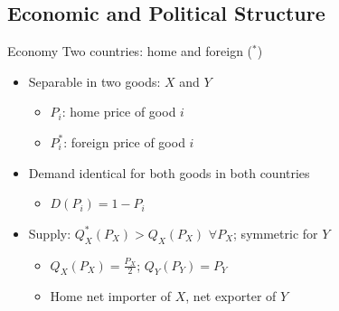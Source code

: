 \documentclass[handout]{beamer}
\begin{document}
\subsection{Economic and Political Structure}
\begin{frame}{Economy}
Two countries: home and foreign (${}^*$)
\pause
\begin{itemize}[<+->]
	\item Separable in two goods: $X$ and $Y$
			\begin{itemize}
				\item $P_i$: home price of good $i$
				\item $P_i^*$: foreign price of good $i$
			\end{itemize}
	\item Demand identical for both goods in both countries
		\begin{itemize}
			\item $D(P_i) = 1 - P_i$
		\end{itemize}
	\item Supply: $Q_X^*(P_X) > Q_X(P_X)$ $\forall P_X$; symmetric for $Y$ 
		\begin{itemize}
			\item $Q_X(P_X) = \frac{P_X}{2}$; $Q_Y(P_Y) = P_Y$
			\item Home net importer of $X$, net exporter of $Y$
		\end{itemize}
\end{itemize}

\end{frame}

\end{document}
